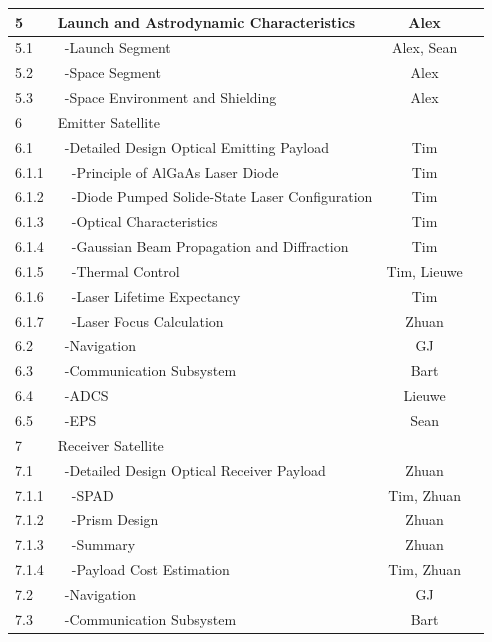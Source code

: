 \begin{center}
\begin{longtable}{|l|l|c|c|}
 5       & Launch and Astrodynamic Characteristics & Alex &\\\hline
 5.1     & \ -Launch Segment                    & Alex, Sean &\\\hline
 5.2     & \ -Space Segment                     & Alex &\\\hline
 5.3     & \ -Space Environment and Shielding   & Alex &\\\hline\hline
 6       & Emitter Satellite                     &&\\\hline
 6.1     & \ -Detailed Design Optical Emitting Payload & Tim &\\\hline
 6.1.1   & \ \ -Principle of AlGaAs Laser Diode & Tim &\\\hline
 6.1.2   & \ \ -Diode Pumped Solide-State Laser Configuration & Tim &\\\hline
 6.1.3   & \ \ -Optical Characteristics        & Tim &\\\hline
 6.1.4   & \ \ -Gaussian Beam Propagation and Diffraction & Tim &\\\hline  
 6.1.5   & \ \ -Thermal Control                & Tim, Lieuwe &\\\hline
 6.1.6   & \ \ -Laser Lifetime Expectancy     & Tim &\\\hline
 6.1.7   & \ \ -Laser Focus Calculation        & Zhuan &\\\hline
 6.2     & \ -Navigation                        & GJ &\\\hline
 6.3     & \ -Communication Subsystem           & Bart &\\\hline
 6.4     & \ -ADCS                              & Lieuwe &\\\hline
 6.5     & \ -EPS                               & Sean &\\\hline
 7       & Receiver Satellite                           &&\\\hline
 7.1     & \ -Detailed Design Optical Receiver Payload & Zhuan &\\\hline
 7.1.1   & \ \ -SPAD                           & Tim, Zhuan &\\\hline
 7.1.2   & \ \ -Prism Design                   & Zhuan &\\\hline
 7.1.3   & \ \ -Summary                        & Zhuan &\\\hline
 7.1.4   & \ \ -Payload Cost Estimation        & Tim, Zhuan &\\\hline
 7.2   & \ -Navigation                        & GJ &\\\hline
 7.3     & \ -Communication Subsystem           & Bart &\\\hline

\end{longtable}
\end{center}
